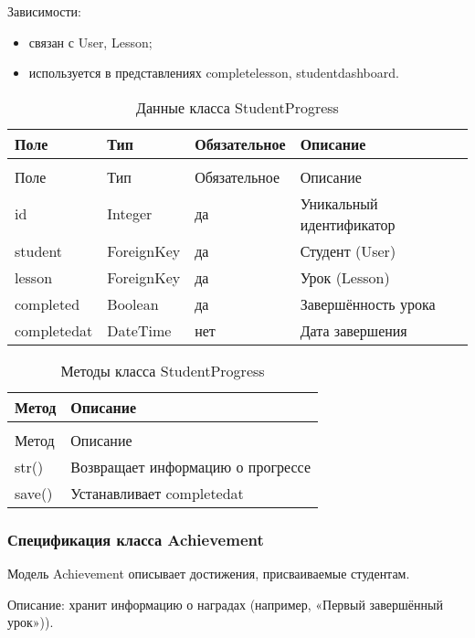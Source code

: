 Зависимости:
	\begin{itemize}
		\item связан с User, Lesson;
		\item используется в представлениях completelesson, studentdashboard.
	\end{itemize}


\begin{xltabular}{\textwidth}{|l|l|l|X|}
	\caption{Данные класса StudentProgress\label{tab:studentprogress_attributes}}\\
	\hline
	Поле & Тип & Обязательное & Описание \\ \hline
	\endfirsthead
	\\
	\hline
	Поле & Тип & Обязательное & Описание \\ \hline
	\endhead
	id & Integer & да & Уникальный идентификатор \\ \hline
	student & ForeignKey & да & Студент (User) \\ \hline
	lesson & ForeignKey & да & Урок (Lesson) \\ \hline
	completed & Boolean & да & Завершённость урока \\ \hline
	completedat & DateTime & нет & Дата завершения \\ \hline
\end{xltabular}

\begin{xltabular}{\textwidth}{|l|X|}
	\caption{Методы класса StudentProgress\label{tab:studentprogress_methods}}\\
	\hline
	Метод & Описание \\ \hline
	\endfirsthead
	\\
	\hline
	Метод & Описание \\ \hline
	\endhead
	str() & Возвращает информацию о прогрессе \\ \hline
	save() & Устанавливает completedat \\ \hline
\end{xltabular}

\subsubsection{Спецификация класса Achievement}

Модель Achievement описывает достижения, присваиваемые студентам.


Описание: хранит информацию о наградах (например, «Первый завершённый урок»)).

